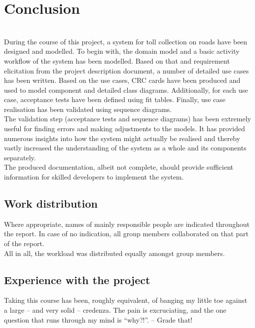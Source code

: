 \chapter{Conclusion}
\pawel \kim \\
During the course of this project, a system for toll collection on roads have been designed and modelled. To begin with, the domain model and a basic activity workflow of the system has been modelled. Based on that and requirement elicitation from the project description document, a number of detailed use cases has been written. Based on the use cases, CRC cards have been produced and used to model component and detailed class diagrams. Additionally, for each use case, acceptance tests have been defined using fit tables. Finally, use case realisation has been validated using sequence diagrams. \\
The validation step (acceptance tests and sequence diagrams) has been extremely useful for finding errors and making adjustments to the models. It has provided numerous insights into how the system might actually be realised and thereby vastly increased the understanding of the system as a whole and its components separately. \\
The produced documentation, albeit not complete, should provide sufficient information for skilled developers to implement the system.

\section{Work distribution}
Where appropriate, names of mainly responsible people are indicated throughout the report. In case of no indication, all group members collaborated on that part of the report. \\ All in all, the workload was distributed equally amongst group members.

\section{Experience with the project}
Taking this course has been, roughly equivalent, of banging my little toe against a large -- and very solid -- credenza. The pain is excruciating, and the one question that runs through my mind is ``why?!''. -- Grade that!
